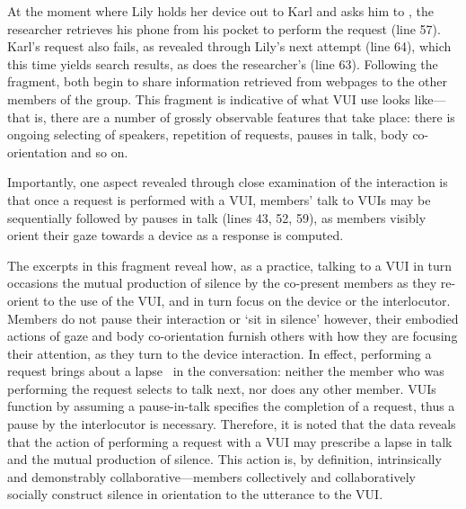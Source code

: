 \begin{revisedsubmission}
At the moment where Lily holds her device out to Karl and asks him to , the researcher retrieves his phone from his pocket to perform the request (line 57).
Karl's request also fails, as revealed through Lily's next attempt (line 64), which this time yields search results, as does the researcher's (line 63).
Following the fragment, both begin to share information retrieved from webpages to the other members of the group.
This fragment is indicative of what \ac{VUI} use looks like–--that is, there are a number of grossly observable features that take place: there is ongoing selecting of speakers, repetition of requests, pauses in talk, body co-orientation and so on.

Importantly, one aspect revealed through close examination of the interaction is that once a request is performed with a \ac{VUI},  members' talk to \acp{VUI} may be sequentially followed by pauses in talk (lines 43, 52, 59), as members visibly orient their gaze towards a device as a response is computed.

% 
The excerpts in this fragment reveal how, as a practice, talking to a \ac{VUI} in turn occasions the mutual production of silence by the co-present members as they re-orient to the use of the \ac{VUI}, and in turn focus on the device or the interlocutor.
Members do not pause their interaction or `sit in silence' however, their embodied actions of gaze and body co-orientation furnish others with how they are focusing their attention, as they turn to the device interaction.
In effect, performing a request brings about a lapse~\citep{Hoey2015} in the conversation: neither the member who was performing the request selects to talk next, nor does any other member.
\acp{VUI} function by assuming a pause-in-talk specifies the completion of a request, thus a pause by the interlocutor is necessary.
Therefore, it is noted that the data reveals that the action of performing a request with a \ac{VUI} may prescribe a lapse in talk and the mutual production of silence.
This action is, by definition, intrinsically and demonstrably collaborative---members collectively and collaboratively socially construct silence in orientation to the utterance to the \ac{VUI}.


\end{revisedsubmission}
